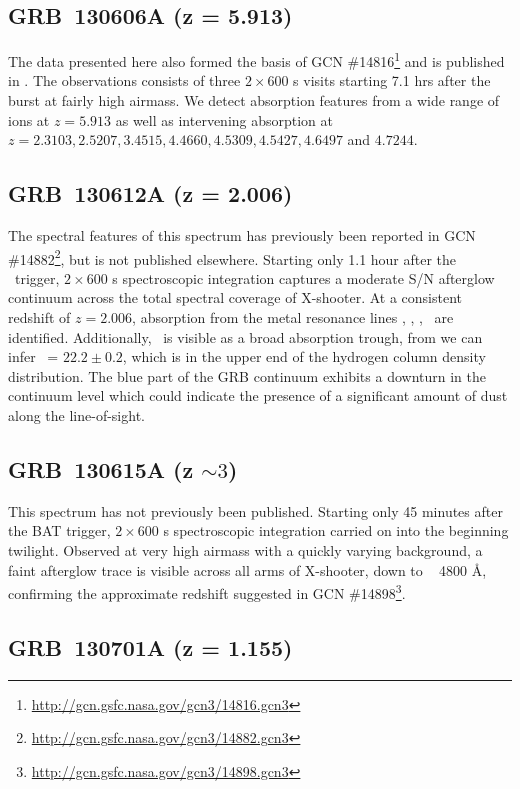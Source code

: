 \documentclass{aa}    %
\begin{document}
\subsection{GRB~130606A (z = 5.913)}

The data presented here also formed the basis of GCN
\#14816\footnote{\url{http://gcn.gsfc.nasa.gov/gcn3/14816.gcn3}} and is
published in \citet{Hartoog2015}. The observations consists of three
$2\times600$ s visits starting 7.1 hrs after the burst at fairly high airmass.
We detect absorption features from a wide range of ions at $z=5.913$ as well as
intervening absorption at $z=2.3103, 2.5207, 3.4515, 4.4660, 4.5309, 4.5427,
4.6497 $ and $ 4.7244$.


\subsection{GRB~130612A (z = 2.006)}

The spectral features of this spectrum has previously been reported in GCN
\#14882\footnote{\url{http://gcn.gsfc.nasa.gov/gcn3/14882.gcn3}}, but is not
published elsewhere. Starting only 1.1 hour after the \swift~trigger,
$2\times600$ s spectroscopic integration captures a moderate S/N afterglow
continuum across the total spectral coverage of X-shooter. At a consistent
redshift of $z = 2.006$, absorption from the metal resonance lines \feii, \mnii,
\mgii, \mgi~are identified. Additionally, \lya~is visible as a broad absorption
trough, from we can infer \nh~= $22.2 \pm 0.2$, which is in the upper end of the
hydrogen column density distribution. The blue part of the GRB continuum
exhibits a downturn in the continuum level which could indicate the presence of
a significant amount of dust along the line-of-sight.

\subsection{GRB~130615A (z $\sim 3$)}

This spectrum has not previously been published. Starting only 45 minutes after
the BAT trigger, $2\times600$ s spectroscopic integration carried on into the
beginning twilight. Observed at very high airmass with a quickly varying
background, a faint afterglow trace is visible across all arms of X-shooter,
down to ~ 4800 \AA, confirming the approximate redshift suggested in GCN
\#14898\footnote{\url{http://gcn.gsfc.nasa.gov/gcn3/14898.gcn3}}.


\subsection{GRB~130701A (z = 1.155)}	
\end{document}
